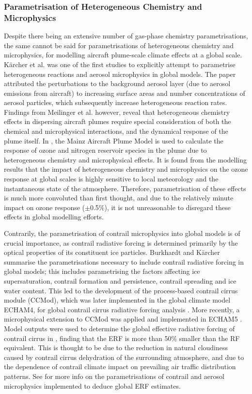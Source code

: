 \subsubsection{Parametrisation of Heterogeneous Chemistry and Microphysics}
Despite there being an extensive number of gas-phase chemistry parametrisations, the same cannot be said for parametrisations of heterogeneous chemistry and microphysics, for modelling aircraft plume-scale climate effects at a global scale. K{\"a}rcher et al. \cite{Karcher1998} was one of the first studies to explicitly attempt to parametrise heterogeneous reactions and aerosol microphysics in global models. The paper attributed the perturbations to the background aerosol layer (due to aerosol emissions from aircraft) to increasing surface areas and number concentrations of aerosol particles, which subsequently increase heterogeneous reaction rates. Findings from Meilinger et al. \cite{Meilinger2002, Meilinger2005} however, reveal that heterogeneous chemistry effects in dispersing aircraft plumes require special consideration of both the chemical and microphysical interactions, and the dynamical response of the plume itself. In \cite{Meilinger2005}, the Mainz Aircraft Plume Model is used to calculate the response of ozone and nitrogen reservoir species in the plume due to heterogeneous chemistry and microphysical effects. It is found from the modelling results that the impact of heterogeneous chemistry and microphysics on the ozone response at global scales is highly sensitive to local meteorology and the instantaneous state of the atmosphere. Therefore, parametrisation of these effects is much more convoluted than first thought, and due to the relatively minute impact on ozone response ($\pm$0.5\%), it is not unreasonable to disregard these effects in global modelling efforts.

Contrarily, the parametrisation of contrail microphysics into global models is of crucial importance, as contrail radiative forcing is determined primarily by the optical properties of its constituent ice particles. Burkhardt and K{\"a}rcher \cite{Burkhardt2009} summarise the parametrisations necessary to include contrail radiative forcing in global models; this includes parametrising the factors affecting ice supersaturation, contrail formation and persistence, contrail spreading and ice water content. This led to the development of the process-based contrail cirrus module (CCMod), which was later implemented in the global climate model ECHAM4, for global contrail cirrus radiative forcing analysis \cite{Burkhardt2010, Burkhardt2011, Lee2009}. More recently, a microphysical extension to CCMod was applied and implemented in ECHAM5 \cite{Bickel2020, Bock2016}. Model outputs were used to determine the global effective radiative forcing of contrail cirrus in \cite{Lee2021}, finding that the ERF is more than 50\% smaller than the RF equivalent. This is thought to be due to the reduction in natural cloudiness caused by contrail cirrus dehydration of the surrounding atmosphere, and due to the dependence of contrail climate impact on prevailing air traffic distribution patterns. See \cite{Lee2021} for more info on the parametrisations of contrail and aerosol microphysics implemented to deduce global ERF estimates.


